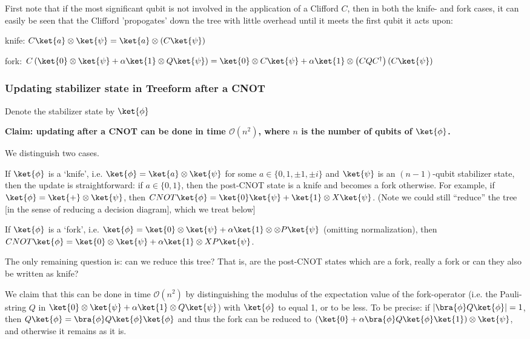 First note that if the most significant qubit is not involved in the application of a Clifford $C$, then in both the knife- and fork cases, it can easily be seen that the Clifford 'propogates' down the tree with little overhead until it meets the first qubit it acts upon:

knife: $C\ket{a} \otimes \ket{\psi} = \ket{a} \otimes \left( C\ket{\psi}\right)$

fork:
$
C \left( \ket{0} \otimes \ket{\psi} + \alpha \ket{1} \otimes Q\ket{\psi}\right)
=
\ket{0} \otimes C\ket{\psi} + \alpha \ket{1} \otimes \left(CQC^{\dagger}\right) \left(C\ket{\psi}\right)
$

\subsubsection{Updating stabilizer state in Treeform after a CNOT}

Denote the stabilizer state by $\ket{\phi}$

\textbf{Claim: updating after a CNOT can be done in time $\mathcal{O}(n^2)$, where $n$ is the number of qubits of $\ket{\phi}$.}

We distinguish two cases.

If $\ket{\phi}$ is a `knife', i.e. $\ket{\phi} = \ket{a} \otimes \ket{\psi}$ for some $a \in \{0, 1, \pm 1, \pm i\}$ and $\ket{\psi}$ is an $(n-1)$-qubit stabilizer state, then the update is straightforward: if $a\in \{0, 1\}$, then the post-CNOT state is a knife and becomes a fork otherwise.
For example, if $\ket{\phi} = \ket{+}\otimes\ket{\psi}$, then $CNOT\ket{\phi} = \ket{0} \ket{\psi} + \ket{1} \otimes X \ket{\psi}$.
(Note we could still ``reduce'' the tree [in the sense of reducing a decision diagram], which we treat below]

If $\ket{\phi}$ is a `fork', i.e. $\ket{\phi} = \ket{0} \otimes \ket{\psi} + \alpha \ket{1}\otimes \otimes P \ket{\psi}$ (omitting normalization), then $CNOT\ket{\phi} = \ket{0} \otimes \ket{\psi} + \alpha \ket{1} \otimes XP \ket{\psi}$.

The only remaining question is: can we reduce this tree?
That is, are the post-CNOT states which are a fork, really a fork or can they also be written as knife?

We claim that this can be done in time $\mathcal{O}(n^2)$ by distinguishing the modulus of the expectation value of the fork-operator (i.e. the Pauli-string $Q$ in $\ket{0} \otimes \ket{\psi} + \alpha \ket{1} \otimes Q\ket{\psi}$) with $\ket{\phi}$ to equal 1, or to be less.
To be precise: if $|\bra{\phi} Q \ket{\phi}| = 1$, then $Q\ket{\phi} = \bra{\phi} Q\ket{\phi} \ket{\phi}$ and thus the fork can be reduced to $\left(\ket{0} + \alpha \bra{\phi} Q\ket{\phi} \ket{1} \right) \otimes \ket{\psi}$, and otherwise it remains as it is.

